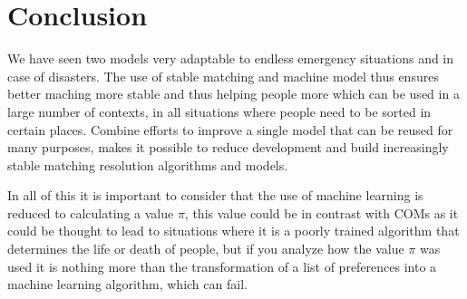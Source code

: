 \section{Conclusion}

We have seen two models very adaptable to endless emergency situations and in case of disasters.
The use of stable matching and machine model thus ensures better maching more stable and thus helping people more which can be used in a large number of contexts, in all situations where people need to be sorted in certain places.
Combine efforts to improve a single model that can be reused for many purposes, makes it possible to reduce development and build increasingly stable matching resolution algorithms and models.

In all of this it is important to consider that the use of machine learning is reduced to calculating a value \(\pi\), this value could be in contrast with COMs as it could be thought to lead to situations where it is a poorly trained algorithm that determines the life or death of people, but if you analyze how the value \(\pi\) was used it is nothing more than the transformation of a list of preferences into a machine learning algorithm, which can fail.